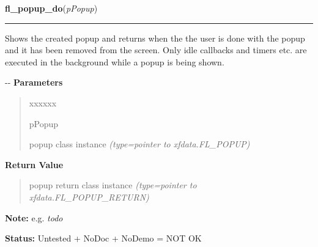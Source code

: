 \hspace{.8\funcindent}\begin{boxedminipage}{\funcwidth}

    \raggedright \textbf{fl\_popup\_do}(\textit{pPopup})

    \vspace{-1.5ex}

    \rule{\textwidth}{0.5\fboxrule}
\setlength{\parskip}{2ex}

Shows the created popup and returns when the the user is done with the
popup and it has been removed from the screen. Only idle callbacks and
timers etc. are executed in the background while a popup is being shown.

-{}-
\setlength{\parskip}{1ex}
      \textbf{Parameters}
      \vspace{-1ex}

      \begin{quote}
        \begin{Ventry}{xxxxxx}

          \item[pPopup]


popup class instance
            {\it (type=pointer to xfdata.FL\_POPUP)}

        \end{Ventry}

      \end{quote}

      \textbf{Return Value}
    \vspace{-1ex}

      \begin{quote}

popup return class instance
      {\it (type=pointer to xfdata.FL\_POPUP\_RETURN)}

      \end{quote}

\textbf{Note:} 
e.g. \emph{todo}


\textbf{Status:} 
Untested + NoDoc + NoDemo = NOT OK


    \end{boxedminipage}

    \label{xformslib:flpopup:fl_popup_set_position}

    \vspace{0.5ex}

